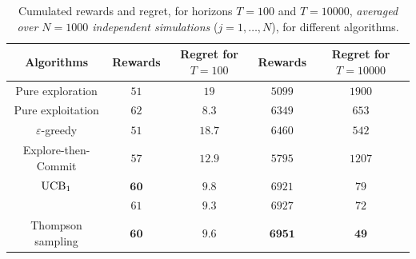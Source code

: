 \begin{table}[ht]
    \begin{small}  %
        \centering
        \begin{tabular}{c|cc|cc}
        \textbf{Algorithms}
        & Rewards
        & Regret for $T=100$
        & Rewards
        & Regret for $T=10000$ \\
            \hline
            Pure exploration
                & $51$ & $19$
                & $5099$ & $1900$ \\
            Pure exploitation
                & $62$ & $8.3$
                & $6349$ & $653$ \\
            \hline
            $\varepsilon$-greedy
                & $51$ & $18.7$
                & $6460$ & $542$ \\
            Explore-then-Commit
                & $57$ & $12.9$
                & $5795$ & $1207$ \\
            \hline
            $\mathrm{UCB}_1$
                & $\mathbf{60}$ & $\mathbf{9.8}$
                & $6921$ & $79$ \\
            \klUCB{}
                & $61$ & $9.3$
                & $6927$ & $72$ \\
            \hline
            Thompson sampling
                & $\mathbf{60}$ & $\mathbf{9.6}$
                & $\mathbf{6951}$ & $\mathbf{49}$ \\
        \end{tabular}
        \caption{Cumulated rewards and regret, for horizons $T=100$ and $T=10000$, \emph{averaged over $N=1000$ independent simulations} ($j=1,\dots,N$), for different algorithms.}
        \label{table:2:meanResults}
    \end{small}  %
\end{table}




